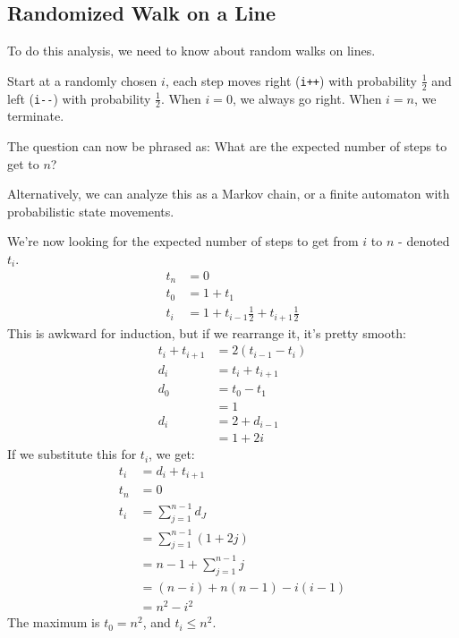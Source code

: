                 \subsection{Randomized Walk on a Line} %
                \label{sub:randomized_walk_on_a_line}
                    To do this analysis, we need to know about random walks on lines.

                    Start at a randomly chosen $i$, each step moves right (\verb|i++|) with probability $\frac{1}{2}$ and left (\verb|i--|) with probability $\frac{1}{2}$.
                    When $i=0$, we always go right.
                    When $i=n$, we terminate.

                    The question can now be phrased as:
                    What are the expected number of steps to get to $n$?

                    Alternatively, we can analyze this as a Markov chain, or a finite automaton with probabilistic state movements.

                    We're now looking for the expected number of steps to get from $i$ to $n$ - denoted $t_i$.
                    \begin{align*}
                        t_n &= 0 \\
                        t_0 &= 1 + t_1 \\
                        t_i &= 1 + t_{i-1} \frac{1}{2} + t_{i+1} \frac{1}{2}
                    \end{align*}
                    This is awkward for induction, but if we rearrange it, it's pretty smooth:
                    \begin{align*}
                        t_i + t_{i+1} &= 2 (t_{i-1} - t_{i}) \\
                        d_i &= t_i + t_{i+1} \\
                        d_0 &= t_0 - t_1 \\
                        &= 1 \\
                        d_i &= 2 + d_{i - 1} \\
                        &= 1 + 2i
                    \end{align*}
                    If we substitute this for $t_i$, we get:
                    \begin{align*}
                        t_i &= d_i + t_{i + 1} \\
                        t_n &= 0 \\
                        t_i &= \sum_{j=1}^{n-1} d_J \\
                        &= \sum_{j=1}^{n-1} (1 + 2j) \\
                        &= n-1 + \sum_{j=1}^{n-1} j \\
                        &= (n - i) + n(n-1) - i (i - 1) \\
                        &= n^2 - i^2
                    \end{align*}
                    The maximum is $t_0 = n^2$, and $t_i \le n^2$.
